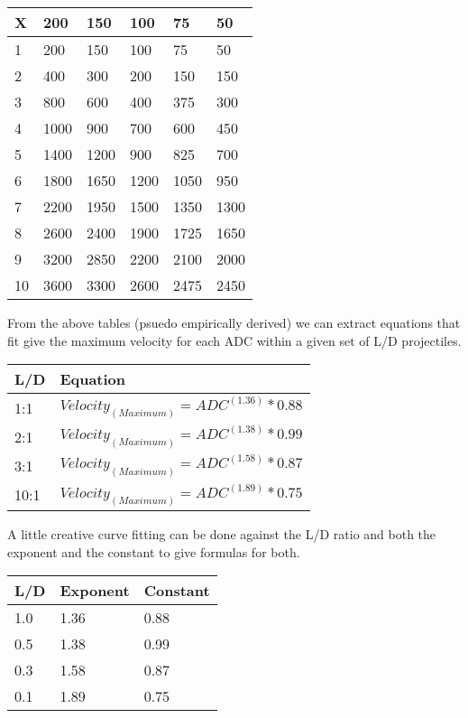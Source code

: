 \begin{tabular}{llllll} \hline 
X &     200 &      150 &     100 &      75 &      50 \\ \hline
1 &     200 &      150 &     100 &      75 &      50 \\
2 &     400 &      300 &     200 &     150 &     150 \\
3 &     800 &      600 &     400 &     375 &     300 \\
4 &    1000 &      900 &     700 &     600 &     450 \\
5 &    1400 &     1200 &     900 &     825 &     700 \\
6 &    1800 &     1650 &    1200 &    1050 &     950 \\
7 &    2200 &     1950 &    1500 &    1350 &    1300 \\
8 &    2600 &     2400 &    1900 &    1725 &    1650 \\
9 &    3200 &     2850 &    2200 &    2100 &    2000 \\
10&    3600 &     3300 &    2600 &    2475 &    2450 \\ \hline 
\end{tabular}

From the above tables (psuedo empirically derived) we can extract 
equations that fit give the maximum velocity for each ADC within a
given set of L/D projectiles.

\begin{tabular}{ll} \hline 
L/D			& Equation \\ \hline 
1:1			& \(Velocity_{(Maximum)} = ADC^{(1.36)} * 0.88 \)\\  
2:1			& \(Velocity_{(Maximum)} = ADC^{(1.38)} * 0.99 \) \\
3:1			& \(Velocity_{(Maximum)} = ADC^{(1.58)} * 0.87 \) \\
10:1		& \(Velocity_{(Maximum)} = ADC^{(1.89)} * 0.75 \) \\ 
\hline 
\end{tabular}

A little creative curve fitting can be done against the L/D ratio 
and both the exponent and the constant to give formulas for both.

\begin{tabular}{lll} \hline 
L/D	& Exponent	& Constant \\ \hline 
1.0	& 1.36	   & 0.88 \\
0.5 & 1.38     & 0.99 \\
0.3 & 1.58     & 0.87 \\
0.1 & 1.89     & 0.75 \\ \hline 
\end{tabular}

